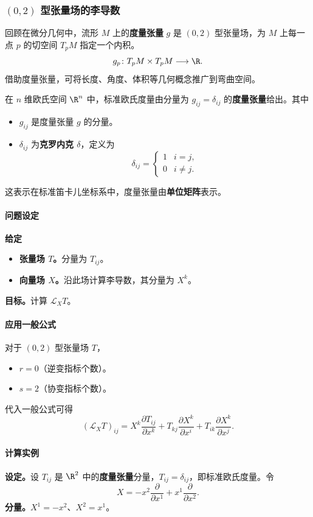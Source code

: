 \subsubsection{$(0,2)$ 型张量场的李导数}
回顾在微分几何中，流形 $M$ 上的\textbf{度量张量} $g$ 是 $(0,2)$ 型张量场，为 $M$ 上每一点 $p$ 的切空间 $T_pM$ 指定一个内积。
\[
  g_p\colon T_pM\times T_pM\longrightarrow\R.
\]
借助度量张量，可将长度、角度、体积等几何概念推广到弯曲空间。

在 $n$ 维欧氏空间 $\R^n$ 中，标准欧氏度量由分量为 $g_{ij}=\delta_{ij}$ 的\textbf{度量张量}给出。其中
\begin{itemize}
  \item $g_{ij}$ 是度量张量 $g$ 的分量。
  \item $\delta_{ij}$ 为\textbf{克罗内克 $\delta$}，定义为
  \[
    \delta_{ij}=\begin{cases}1&i=j,\\0&i\ne j.\end{cases}
  \]
\end{itemize}
这表示在标准笛卡儿坐标系中，度量张量由\textbf{单位矩阵}表示。

\paragraph{问题设定}
\textbf{给定}
\begin{itemize}
  \item \textbf{张量场 $T$。}分量为 $T_{ij}$。
  \item \textbf{向量场 $X$。}沿此场计算李导数，其分量为 $X^k$。
\end{itemize}
\textbf{目标。}计算 $\mathcal L_X T$。

\paragraph{应用一般公式}
对于 $(0,2)$ 型张量场 $T$，
\begin{itemize}
  \item $r=0$（逆变指标个数）。
  \item $s=2$（协变指标个数）。
\end{itemize}
代入一般公式可得
\[
  (\mathcal L_X T)_{ij}
      =X^k\frac{\partial T_{ij}}{\partial x^k}
       +T_{kj}\frac{\partial X^k}{\partial x^i}
       +T_{ik}\frac{\partial X^k}{\partial x^j}.
\]

\paragraph{计算实例}
\textbf{设定。}设 $T_{ij}$ 是 $\R^2$ 中的\textbf{度量张量}分量，$T_{ij}=\delta_{ij}$，即标准欧氏度量。令
\[
  X=-x^2\frac{\partial}{\partial x^1}+x^1\frac{\partial}{\partial x^2}.
\]
\textbf{分量。}$X^1=-x^2$、$X^2=x^1$。

